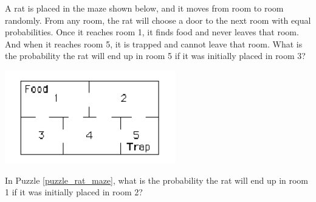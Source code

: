 \begin{puzzle}\label{puzzle_rat_maze}
    A rat is placed in the maze shown below, and it moves from room to room randomly. From any
    room, the rat will choose a door to the next room with equal probabilities. Once it reaches room
    1, it finds food and never leaves that room. And when it reaches room 5, it is trapped and cannot
    leave that room. What is the probability the rat will end up in room 5 if it was initially placed in
    room 3?

    \begin{center}
        \includegraphics{chapters/markov_hw/section03/maze.png}
    \end{center}




\end{puzzle}

\begin{puzzle}
    In Puzzle \ref{puzzle_rat_maze}, what is the probability the rat will end up in room 1 if it was initially placed in
    room 2?

\end{puzzle}